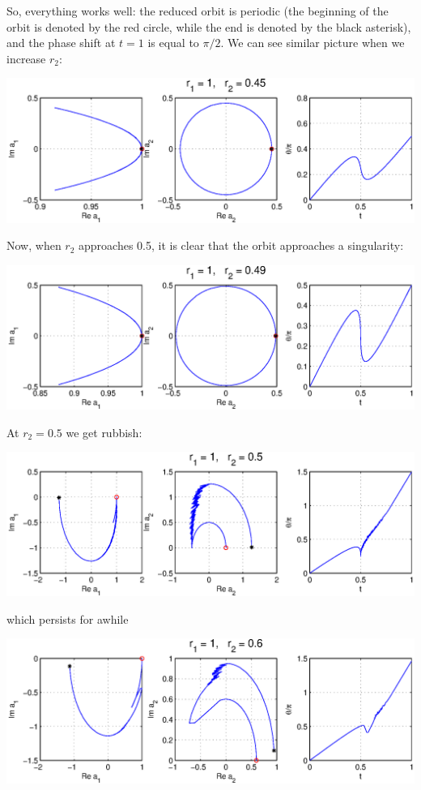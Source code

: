 \documentclass[letter,10pt]{article}
\begin{document}
So, everything works well: the reduced orbit is periodic (the beginning of the orbit is denoted by the red circle, while the end is denoted by the black asterisk), and the phase shift at $t = 1$ is equal to $\pi/2$.  We can see similar picture when we increase $r_2$:

\vspace{2ex}\noindent\includegraphics[width=\textwidth]{sliceflow2.eps}

Now, when $r_2$ approaches 0.5, it is clear that the orbit approaches a singularity:

\vspace{2ex}\noindent\includegraphics[width=\textwidth]{sliceflow3.eps}

At $r_2 = 0.5$ we get rubbish:

\vspace{2ex}\noindent\includegraphics[width=\textwidth]{sliceflow4.eps}

which persists for awhile

\vspace{2ex}\noindent\includegraphics[width=\textwidth]{sliceflow5.eps}
\end{document}
